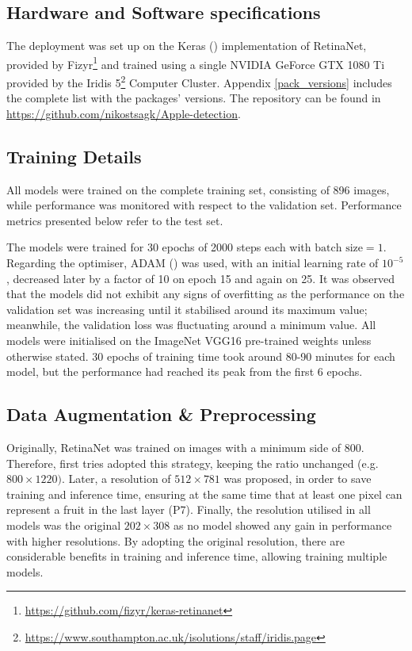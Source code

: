\subsection{Hardware and Software specifications}
The deployment was set up on the Keras (\cite{chollet2015keras}) implementation of RetinaNet, provided by Fizyr\footnote{\url{https://github.com/fizyr/keras-retinanet}} and trained using a single NVIDIA GeForce GTX 1080 Ti provided by the Iridis 5\footnote{\url{https://www.southampton.ac.uk/isolutions/staff/iridis.page}} Computer Cluster. Appendix \ref{pack_versions} includes the complete list with the packages' versions. The repository can be found in \url{https://github.com/nikostsagk/Apple-detection}.

\subsection{Training Details}
All models were trained on the complete training set, consisting of 896 images, while performance was monitored with respect to the validation set. Performance metrics presented below refer to the test set.

The models were trained for 30 epochs of 2000 steps each with $\text{batch size} = 1$. Regarding the optimiser, ADAM (\cite{kingma2014adam}) was used, with an initial learning rate of $10^{-5}$, decreased later by a factor of 10 on epoch 15 and again on 25. It was observed that the models did not exhibit any signs of overfitting as the performance on the validation set was increasing until it stabilised around its maximum value; meanwhile, the validation loss was fluctuating around a minimum value. All models were initialised on the ImageNet VGG16 pre-trained weights unless otherwise stated. 30 epochs of training time took around 80-90 minutes for each model, but the performance had reached its peak from the first 6 epochs.

\subsection{Data Augmentation \& Preprocessing}
Originally, RetinaNet was trained on images with a minimum side of 800. Therefore, first tries adopted this strategy, keeping the ratio unchanged (e.g. $800\times1220)$. Later, a resolution of $512\times781$ was proposed, in order to save training and inference time, ensuring at the same time that at least one pixel can represent a fruit in the last layer (P7). Finally, the resolution utilised in all models was the original $202\times308$ as no model showed any gain in performance with higher resolutions. By adopting the original resolution, there are considerable benefits in training and inference time, allowing training multiple models.

